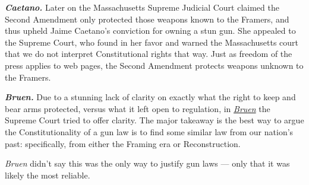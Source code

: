\documentclass[10pt]{article}
\begin{document}
\vspace{0.5cm}
\textbf{\textit{Caetano.}}  Later on the Massachusetts Supreme Judicial Court claimed the Second Amendment only protected those weapons known to the Framers, and thus upheld Jaime Caetano's conviction for owning a stun gun.  She appealed to the Supreme Court, who found in her favor and warned the Massachusetts court that we do not interpret Constitutional rights that way.  Just as freedom of the press applies to web pages, the Second Amendment protects weapons unknown to the Framers.

\vspace{0.5cm}
\textbf{\textit{Bruen.}}  Due to a stunning lack of clarity on exactly what the right to keep and bear arms protected, versus what it left open to regulation, in \href{https://supreme.justia.com/cases/federal/us/597/20-843/}{\textit{Bruen}} the Supreme Court tried to offer clarity.  The major takeaway is the best way to argue the Constitutionality of a gun law is to find some similar law from our nation's past: specifically, from either the Framing era or Reconstruction.

\textit{Bruen} didn't say this was the only way to justify gun laws --- only that it was likely the most reliable.



\clearpage\mbox{}\clearpage
\end{document}
